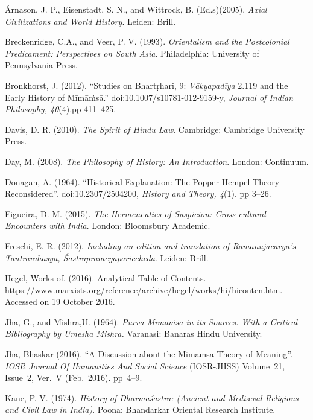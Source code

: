 \begin{thebibliography}{99}
\itemsep=2pt
 Árnason, J. P., Eisenstadt, S. N., and Wittrock, B. (Ed.s)(2005). \textit{Axial Civilizations and World History}. Leiden: Brill.

  Breckenridge, C.A., and Veer, P. V. (1993). \textit{Orientalism and the Postcolonial Predicament: Perspectives on South Asia}. Philadelphia: University of Pennsylvania Press.

  Bronkhorst, J. (2012). “Studies on Bhartṛhari, 9: \textit{Vākyapadīya} 2.119 and the Early History of Mīmāṁsā.” doi:10.1007/s10781-012-9159-y, \textit{Journal of Indian Philosophy, 40}(4).pp 411--425.

  Davis, D. R. (2010). \textit{The Spirit of Hindu Law}. Cambridge: Cambridge University Press.

  Day, M. (2008). \textit{The Philosophy of History: An Introduction}. London: Continuum.

  Donagan, A. (1964). “Historical Explanation: The Popper-Hempel Theory Reconsidered”. doi:10.2307/2504200, \textit{History and Theory, 4}(1). pp 3--26.

  Figueira, D. M. (2015). \textit{The Hermeneutics of Suspicion: Cross-cultural Encounters with India}. London: Bloomsbury Academic.

  Freschi, E. R. (2012). \textit{Including an edition and translation of Rāmānujācārya's Tantrarahasya, Śāstraprameyapariccheda}. Leiden: Brill.

  Hegel, Works of. (2016). Analytical Table of Contents. \url{https://www.marxists.org/reference/archive/hegel/works/hi/hiconten.htm}. Accessed on 19 October 2016.

  Jha, G., and Mishra,U. (1964). \textit{Pūrva-Mīmāṁsā in its Sources. With a Critical Bibliography by Umesha Mishra.} Varanasi: Banaras Hindu University.

  Jha, Bhaskar (2016). “A Discussion about the Mimamsa Theory of Meaning”. \textit{IOSR Journal Of Humanities And Social Science} (IOSR-JHSS) Volume~21, Issue~2, Ver.~V (Feb.~2016). pp~4--9.

  Kane, P. V. (1974). \textit{History of Dharmaśāstra: (Ancient and Mediæval Religious and Civil Law in India)}. Poona: Bhandarkar Oriental Research Institute.


\end{thebibliography}
